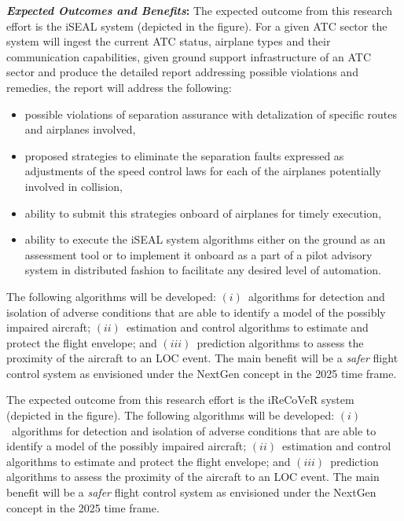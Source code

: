 \documentclass[letter,onecolumn,12pt]{aiaa-tc}
\begin{document}
\medskip

\textbf{\emph{Expected Outcomes and Benefits}:} The expected outcome from this research effort is the iSEAL system (depicted in the figure). For a given ATC sector the system will ingest the current ATC status, airplane types and their communication capabilities, given ground support infrastructure of an ATC sector and produce the detailed report addressing possible violations and remedies, the report will address the following:
\begin{itemize}
    \item possible violations of separation assurance with detalization of specific routes and airplanes involved,
    \item proposed strategies to eliminate the separation faults expressed as adjustments of the speed control laws for each of the airplanes potentially involved in collision,
    \item ability to submit this strategies onboard of airplanes for timely execution,
    \item ability to execute the iSEAL system algorithms either on the ground as an assessment tool or to implement it onboard as a part of a pilot advisory system in distributed fashion to facilitate any desired level of automation.
\end {itemize}
        
The following algorithms will be developed: $(i)$~algorithms for detection and isolation of adverse conditions that are able to identify a model of the possibly impaired aircraft; $(ii)$~estimation and control algorithms to estimate and protect the flight envelope; and $(iii)$~prediction algorithms to assess the proximity of the aircraft to an LOC event. The main benefit will be a \emph{safer} flight control system as envisioned under the NextGen concept in the 2025 time frame.


The expected outcome from this research effort is the iReCoVeR system (depicted in the figure). The following algorithms will be developed: $(i)$~algorithms for detection and isolation of adverse conditions that are able to identify a model of the possibly impaired aircraft; $(ii)$~estimation and control algorithms to estimate and protect the flight envelope; and $(iii)$~prediction algorithms to assess the proximity of the aircraft to an LOC event. The main benefit will be a \emph{safer} flight control system as envisioned under the NextGen concept in the 2025 time frame.
\end{document}
